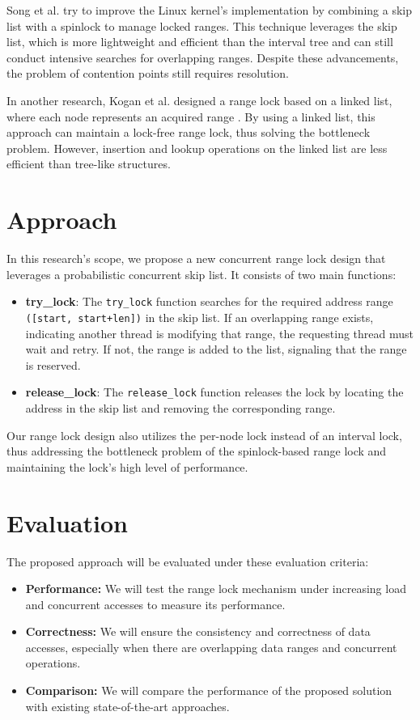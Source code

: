 Song et al. try to improve the Linux kernel's implementation by combining a skip list with a spinlock to manage locked ranges\parencite{migrationWM2023}. This technique leverages the skip list, which is more lightweight and efficient than the interval tree and can still conduct intensive searches for overlapping ranges. Despite these advancements, the problem of contention points still requires resolution.

In another research, Kogan et al. designed a range lock based on a linked list, where each node represents an acquired range \parencite{scalableRangeLock2020}. By using a linked list, this approach can maintain a lock-free range lock, thus solving the bottleneck problem. However, insertion and lookup operations on the linked list are less efficient than tree-like structures. 

\newpage

\section{Approach}
In this research's scope, we propose a new concurrent range lock design that leverages a probabilistic concurrent skip list\parencite{herlihy2006provably, herlihy2020art}. It consists of two main functions:
\begin{itemize}
    \item \textbf{try\_lock}: The \texttt{try\_lock} function searches for the required address range \texttt{([start, start+len])} in the skip list. If an overlapping range exists, indicating another thread is modifying that range, the requesting thread must wait and retry. If not, the range is added to the list, signaling that the range is reserved.
    \item \textbf{release\_lock}: The \texttt{release\_lock} function releases the lock by locating the address in the skip list and removing the corresponding range. 
\end{itemize} 

Our range lock design also utilizes the per-node lock instead of an interval lock, thus addressing the bottleneck problem of the spinlock-based range lock and maintaining the lock's high level of performance. 

\section{Evaluation}
The proposed approach will be evaluated under these evaluation criteria:
\begin{itemize}
    \item \textbf{Performance:} We will test the range lock mechanism under increasing load and concurrent accesses to measure its performance.
    \item \textbf{Correctness:} We will ensure the consistency and correctness of data accesses, especially when there are overlapping data ranges and concurrent operations.
    \item \textbf{Comparison:} We will compare the performance of the proposed solution with existing state-of-the-art approaches.
\end{itemize}

